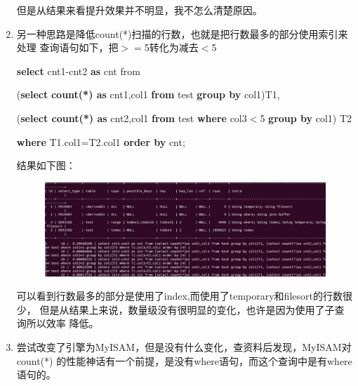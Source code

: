 \documentclass[UTF8]{ctexart}
\begin{document}
\begin{enumerate}
        但是从结果来看提升效果并不明显，我不怎么清楚原因。
        \item 另一种思路是降低count(*)扫描的行数，也就是把行数最多的部分使用索引来处理
            查询语句如下，把$>=$5转化为减去$<$5
            
            \textbf{select} cnt1-cnt2 \textbf{as} cnt from 
            
            (\textbf{select} \textbf{count(*) as} cnt1,col1 \textbf{from} test \textbf{group by} col1)T1,
            
            (\textbf{select count(*) as }cnt2,col1 \textbf{from} test \textbf{where }col3$<$5 \textbf{group by }col1) T2
            
            \textbf{where} T1.col1=T2.col1 \textbf{order by} cnt;
            
            结果如下图：
        \begin{figure}[ht]
            \centering
            \includegraphics[scale=0.55]{db7.jpg}
            \label{fig:db7}
        \end{figure}    
        
        可以看到行数最多的部分是使用了index,而使用了temporary和filesort的行数很少，
        但是从结果上来说，数量级没有很明显的变化，也许是因为使用了子查询所以效率
        降低。
        \item 尝试改变了引擎为MyISAM，但是没有什么变化，查资料后发现，MyISAM对count(*)
            的性能神话有一个前提，是没有where语句，而这个查询中是有where语句的。
    \end{enumerate}
\end{document}
